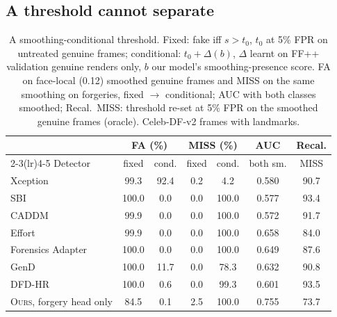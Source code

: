 \documentclass[conference]{IEEEtran}
\newcommand{\ours}{\textsc{Ours}}
\begin{document}
\subsection{A threshold cannot separate}
\label{sec:threshold}
\begin{table}[t]
\centering
\caption{A smoothing-conditional threshold. Fixed: fake iff $s>t_0$, $t_0$ at 5\% FPR on untreated genuine frames; conditional: $t_0+\Delta(b)$, $\Delta$ learnt on FF++ validation genuine renders only, $b$ our model's smoothing-presence score. FA on face-local (0.12) smoothed genuine frames and MISS on the same smoothing on forgeries, fixed $\to$ conditional; AUC with both classes smoothed; Recal.\ MISS: threshold re-set at 5\% FPR on the smoothed genuine frames (oracle). Celeb-DF-v2 frames with landmarks.}
\label{tab:bct}
\scriptsize
\setlength{\tabcolsep}{3pt}
\begin{tabular}{@{}l cc cc c c@{}}
\toprule
 & \multicolumn{2}{c}{FA (\%)} & \multicolumn{2}{c}{MISS (\%)} & AUC & Recal. \\
\cmidrule(lr){2-3}\cmidrule(lr){4-5}
Detector & fixed & cond. & fixed & cond. & both sm. & MISS \\
\midrule
Xception & 99.3 & 92.4 & 0.2 & 4.2 & 0.580 & 90.7 \\
SBI & 100.0 & 0.0 & 0.0 & 100.0 & 0.577 & 93.4 \\
CADDM & 99.9 & 0.0 & 0.0 & 100.0 & 0.572 & 91.7 \\
Effort & 99.9 & 0.0 & 0.0 & 100.0 & 0.658 & 84.0 \\
Forensics Adapter & 100.0 & 0.0 & 0.0 & 100.0 & 0.649 & 87.6 \\
GenD & 100.0 & 11.7 & 0.0 & 78.3 & 0.632 & 90.8 \\
DFD-HR & 100.0 & 0.6 & 0.0 & 99.3 & 0.601 & 93.5 \\
\ours{}, forgery head only & 84.5 & 0.1 & 2.5 & 100.0 & 0.755 & 73.7 \\
\bottomrule
\end{tabular}
\end{table}
\end{document}
